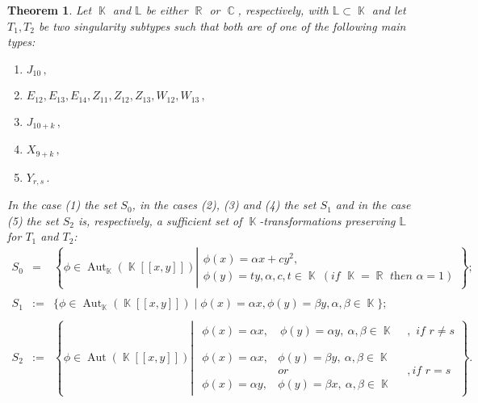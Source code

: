 \documentclass[noend]{amsproc}
\newtheorem{theorem}{Theorem}
\theoremstyle{definition}
\DeclareMathOperator{\R}{\mathbb{R}}
\DeclareMathOperator{\C}{\mathbb{C}}
\DeclareMathOperator{\K}{\mathbb{K}}
\DeclareMathOperator{\Aut}{Aut}
\begin{document}
\begin{theorem}\label{tab:sufficient_sets}
Let $\K$ and $\mathbb L$ be either $\R$ or $\C$, respectively, with $\mathbb L\subset \K$ and let $T_1,T_2$ be two singularity subtypes such that both are of one of the following main types:
\begin{enumerate}
\item $J_{10}\,,$
\item $E_{12},E_{13},E_{14},Z_{11},Z_{12},Z_{13},W_{12},W_{13}\,,$
\item $ J_{10+k}\,,$ 
\item $X_{9+k}\,,$
\item $Y_{r,s}\,.$
\end{enumerate}
In the case (1) the set $S_0$, in the cases (2), (3) and (4) the set $S_1$ and in the case (5) the set $S_2$ is, respectively, a sufficient set of $\K$-transformations preserving $\mathbb L$ for $T_1$ and $T_2$:
\begin{eqnarray*}
S_0&=&\left\{\phi\in\Aut_{\K}(\K[[x,y]])\left |\begin{array}{l}\phi(x)=\alpha x+cy^2,\\\phi(y)=ty, \alpha,c,t\in\K\ (\textit{if $\K=\R$ then $\alpha=1$})\end{array}\right.\right\};\\\\
S_1&:=&\{\phi\in\Aut_{\K}(\K[[x,y]]) \mid \phi(x)=\alpha x, \phi(y)=\beta y, \alpha, \beta\in\K\};\\\\
S_2&:=&\left\{\phi\in\Aut({\K}[[x,y]]) \left |
\begin{array}{ll}\begin{array}{l}\phi(x)=\alpha x,\quad \phi(y)=\alpha y,\ \alpha,\beta\in\K\end{array}&, \textit{ if $r\neq s$}\\\\
\begin{array}{ll}\phi(x)=\alpha x,& \phi(y)=\beta y,\ \alpha,\beta\in\K\\&\textit{or}\\
                        \phi(x)=\alpha y,& \phi(y)=\beta x,\ \alpha,\beta\in\K\end{array}&,\textit{if $r=s$}\end{array}\right.\right\}.
\end{eqnarray*}
\end{theorem}
\end{document}
